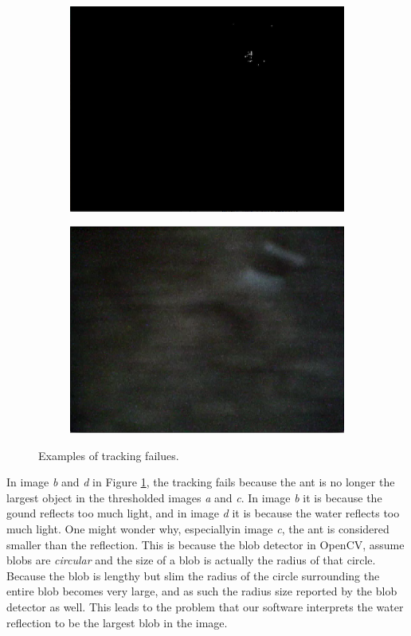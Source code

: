 \begin{figure}
\begin{subfigure}[b]{0.35\textwidth}
                \caption{}
        \end{subfigure}\\ \mbox{}\\
        \begin{subfigure}[b]{0.35\textwidth}
                \includegraphics[scale = 0.3]{img/bad4t}
                \caption{}
        \end{subfigure}
		\quad
        \begin{subfigure}[b]{0.35\textwidth}
                \includegraphics[scale = 0.3]{img/bad4}
                \caption{}
        \end{subfigure}
		\caption{Examples of tracking failues.}
		\label{fig:ant_fail}
\end{figure}

In image \emph{b} and \emph{d} in Figure \ref{fig:ant_fail}, the tracking fails because the ant is no longer the largest object in the thresholded images \emph{a} and \emph{c}. In image \emph{b} it is because the gound reflects too much light, and in image \emph{d} it is because the water reflects too much light. One might wonder why, especiallyin image \emph{c}, the ant is considered smaller than the reflection. This is because the blob detector in OpenCV, assume blobs are \emph{circular} and the size of a blob is actually the radius of that circle. Because the blob is lengthy but slim the radius of the circle surrounding the entire blob becomes very large, and as such the radius size reported by the blob detector as well. This leads to the problem that our software interprets the water reflection to be the largest blob in the image. \\

